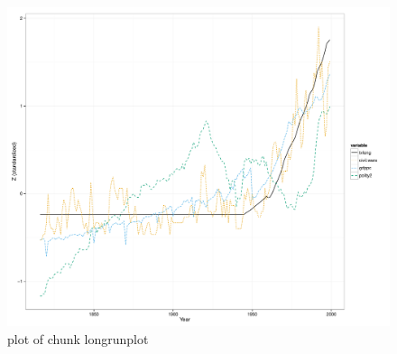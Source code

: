 \documentclass[11pt,article,oneside]{memoir}
\makeatletter
\def\maxwidth{\ifdim\Gin@nat@width>\linewidth\linewidth
\else\Gin@nat@width\fi}
\let\Oldincludegraphics\includegraphics
\renewcommand{\includegraphics}[1]{\Oldincludegraphics[width=\maxwidth]{#1}}
\makeatother
\begin{document}
\begin{figure}[htbp]
\centering
\includegraphics{figure/longrunplot.pdf}
\caption{plot of chunk longrunplot}
\end{figure}
\end{document}
